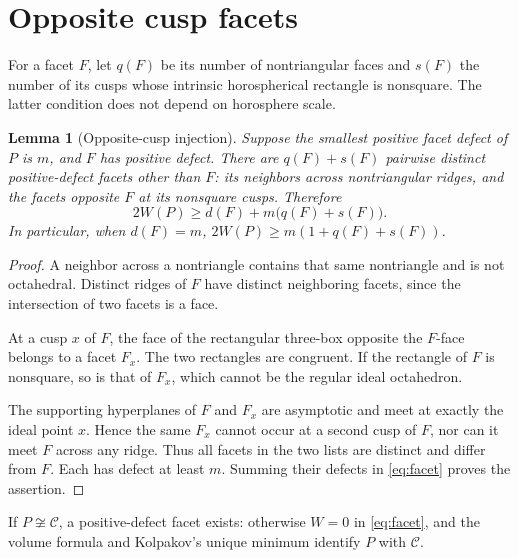 \documentclass[11pt]{article}
\newtheorem{lemma}[theorem]{Lemma}
\theoremstyle{remark}
\newcommand{\CELL}{\mathcal C}
\begin{document}
\section{Opposite cusp facets}\label{sec:injection}
For a facet $F$, let $q(F)$ be its number of nontriangular faces and
$s(F)$ the number of its cusps whose intrinsic horospherical rectangle
is nonsquare. The latter condition does not depend on horosphere scale.

\begin{lemma}[Opposite-cusp injection]\label{lem:injection}
Suppose the smallest positive facet defect of $P$ is $m$, and $F$ has
positive defect. There are $q(F)+s(F)$ pairwise distinct positive-defect
facets other than $F$: its neighbors across nontriangular ridges, and
the facets opposite $F$ at its nonsquare cusps. Therefore
\begin{equation}\label{eq:budget}
 2W(P)\ge d(F)+m\bigl(q(F)+s(F)\bigr).
\end{equation}
In particular, when $d(F)=m$,
$2W(P)\ge m(1+q(F)+s(F))$.
\end{lemma}
\begin{proof}
A neighbor across a nontriangle contains that same nontriangle and is
not octahedral. Distinct ridges of $F$ have distinct neighboring facets,
since the intersection of two facets is a face.

At a cusp $x$ of $F$, the face of the rectangular three-box opposite
the $F$-face belongs to a facet $F_x$. The two rectangles are congruent.
If the rectangle of $F$ is nonsquare, so is that of $F_x$, which cannot
be the regular ideal octahedron.

The supporting hyperplanes of $F$ and $F_x$ are asymptotic and meet
at exactly the ideal point $x$. Hence the same $F_x$ cannot occur at
a second cusp of $F$, nor can it meet $F$ across any ridge. Thus all
facets in the two lists are distinct and differ from $F$. Each has
defect at least $m$. Summing their defects in \eqref{eq:facet} proves
the assertion.
\end{proof}

If $P\not\cong\CELL$, a positive-defect facet exists: otherwise $W=0$
in \eqref{eq:facet}, and the volume formula and Kolpakov's unique
minimum identify $P$ with $\CELL$.
\end{document}
